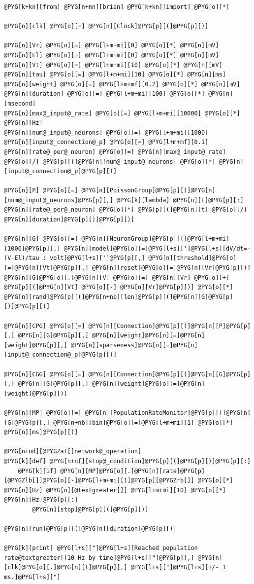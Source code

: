 \documentclass[letterpaper,10pt,english]{manual}
\begin{document}
\begin{Verbatim}[commandchars=@\[\]]
@PYG[k+kn][from] @PYG[n+nn][brian] @PYG[k+kn][import] @PYG[o][*]

@PYG[n][clk] @PYG[o][=] @PYG[n][Clock]@PYG[p][(]@PYG[p][)]

@PYG[n][Vr] @PYG[o][=] @PYG[l+m+mi][0] @PYG[o][*] @PYG[n][mV]
@PYG[n][El] @PYG[o][=] @PYG[l+m+mi][0] @PYG[o][*] @PYG[n][mV]
@PYG[n][Vt] @PYG[o][=] @PYG[l+m+mi][10] @PYG[o][*] @PYG[n][mV]
@PYG[n][tau] @PYG[o][=] @PYG[l+m+mi][10] @PYG[o][*] @PYG[n][ms]
@PYG[n][weight] @PYG[o][=] @PYG[l+m+mf][0.2] @PYG[o][*] @PYG[n][mV]
@PYG[n][duration] @PYG[o][=] @PYG[l+m+mi][100] @PYG[o][*] @PYG[n][msecond]
@PYG[n][max@_input@_rate] @PYG[o][=] @PYG[l+m+mi][10000] @PYG[o][*] @PYG[n][Hz]
@PYG[n][num@_input@_neurons] @PYG[o][=] @PYG[l+m+mi][1000]
@PYG[n][input@_connection@_p] @PYG[o][=] @PYG[l+m+mf][0.1]
@PYG[n][rate@_per@_neuron] @PYG[o][=] @PYG[n][max@_input@_rate] @PYG[o][/] @PYG[p][(]@PYG[n][num@_input@_neurons] @PYG[o][*] @PYG[n][input@_connection@_p]@PYG[p][)]

@PYG[n][P] @PYG[o][=] @PYG[n][PoissonGroup]@PYG[p][(]@PYG[n][num@_input@_neurons]@PYG[p][,] @PYG[k][lambda] @PYG[n][t]@PYG[p][:] @PYG[n][rate@_per@_neuron] @PYG[o][*] @PYG[p][(]@PYG[n][t] @PYG[o][/] @PYG[n][duration]@PYG[p][)]@PYG[p][)]

@PYG[n][G] @PYG[o][=] @PYG[n][NeuronGroup]@PYG[p][(]@PYG[l+m+mi][1000]@PYG[p][,] @PYG[n][model]@PYG[o][=]@PYG[l+s][']@PYG[l+s][dV/dt=-(V-El)/tau : volt]@PYG[l+s][']@PYG[p][,] @PYG[n][threshold]@PYG[o][=]@PYG[n][Vt]@PYG[p][,] @PYG[n][reset]@PYG[o][=]@PYG[n][Vr]@PYG[p][)]
@PYG[n][G]@PYG[o][.]@PYG[n][V] @PYG[o][=] @PYG[n][Vr] @PYG[o][+] @PYG[p][(]@PYG[n][Vt] @PYG[o][-] @PYG[n][Vr]@PYG[p][)] @PYG[o][*] @PYG[n][rand]@PYG[p][(]@PYG[n+nb][len]@PYG[p][(]@PYG[n][G]@PYG[p][)]@PYG[p][)]

@PYG[n][CPG] @PYG[o][=] @PYG[n][Connection]@PYG[p][(]@PYG[n][P]@PYG[p][,] @PYG[n][G]@PYG[p][,] @PYG[n][weight]@PYG[o][=]@PYG[n][weight]@PYG[p][,] @PYG[n][sparseness]@PYG[o][=]@PYG[n][input@_connection@_p]@PYG[p][)]

@PYG[n][CGG] @PYG[o][=] @PYG[n][Connection]@PYG[p][(]@PYG[n][G]@PYG[p][,] @PYG[n][G]@PYG[p][,] @PYG[n][weight]@PYG[o][=]@PYG[n][weight]@PYG[p][)]

@PYG[n][MP] @PYG[o][=] @PYG[n][PopulationRateMonitor]@PYG[p][(]@PYG[n][G]@PYG[p][,] @PYG[n+nb][bin]@PYG[o][=]@PYG[l+m+mi][1] @PYG[o][*] @PYG[n][ms]@PYG[p][)]

@PYG[n+nd][@PYGZat[]network@_operation]
@PYG[k][def] @PYG[n+nf][stop@_condition]@PYG[p][(]@PYG[p][)]@PYG[p][:]
    @PYG[k][if] @PYG[n][MP]@PYG[o][.]@PYG[n][rate]@PYG[p][@PYGZlb[]]@PYG[o][-]@PYG[l+m+mi][1]@PYG[p][@PYGZrb[]] @PYG[o][*] @PYG[n][Hz] @PYG[o][@textgreater[]] @PYG[l+m+mi][10] @PYG[o][*] @PYG[n][Hz]@PYG[p][:]
        @PYG[n][stop]@PYG[p][(]@PYG[p][)]

@PYG[n][run]@PYG[p][(]@PYG[n][duration]@PYG[p][)]

@PYG[k][print] @PYG[l+s]["]@PYG[l+s][Reached population rate@textgreater[]10 Hz by time]@PYG[l+s]["]@PYG[p][,] @PYG[n][clk]@PYG[o][.]@PYG[n][t]@PYG[p][,] @PYG[l+s]["]@PYG[l+s][+/- 1 ms.]@PYG[l+s]["]
\end{Verbatim}
\end{document}
